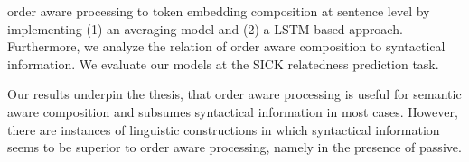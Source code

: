 order aware processing to token embedding composition at sentence level by implementing (1) an averaging model and (2) a \ac{LSTM} based approach. Furthermore, we analyze the relation of order aware composition to syntactical information. We evaluate our models at the SICK relatedness prediction task.%

Our results underpin the thesis, that order aware processing is useful for semantic aware composition and subsumes syntactical information in most cases. However, there are instances of linguistic constructions in which syntactical information seems to be superior to order aware processing, namely in the presence of passive.

